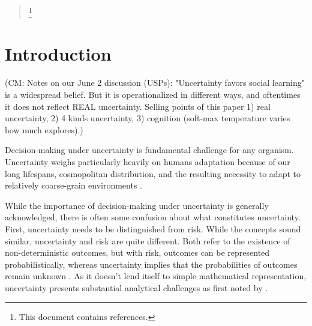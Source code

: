 \documentclass[letterpaper,11.5pt]{scrartcl}
\newcommand{\cm}[1]{{\textcolor{mypurple} {({\tiny CM:} #1)}}}
\begin{document}
\begin{abstract}
\footnote{This document contains
 references.}  
\end{abstract}


\section{Introduction}
\cm{Notes on our June 2 discussion (USPs): "Uncertainty favors social learning" is a widespread belief. But it is operationalized in different ways, and oftentimes it does not reflect REAL uncertainty. Selling points of this paper 1) real uncertainty, 2) 4 kinds uncertainty, 3) cognition (soft-max temperature varies how much explores).}



Decision-making under uncertainty is fundamental challenge for any organism. Uncertainty weighs particularly heavily on humans adaptation because of our long lifespans, cosmopolitan distribution, and the resulting necessity to adapt to relatively coarse-grain environments \cite{levins1962}.

While the importance of decision-making under uncertainty is generally acknowledged, there is often some confusion about what constitutes uncertainty. First, uncertainty needs to be distinguished from risk. While the concepts sound similar, uncertainty and risk are quite different. Both refer to the existence of non-deterministic outcomes, but with risk, outcomes can be represented probabilistically, whereas uncertainty implies that the probabilities of outcomes remain unknown \cite{knight1921}. As it doesn't lend itself to simple mathematical representation, uncertainty presents substantial analytical challenges as first noted by \cite{keynes1921}.
\end{document}
